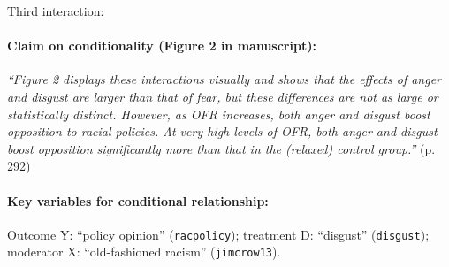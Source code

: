 \documentclass[12pt]{article}
\begin{document}
\noindent Third interaction:

\paragraph{Claim on conditionality (Figure
  2 in manuscript):} \emph{``Figure 2 displays these interactions visually and shows
that the effects of anger and disgust are larger than that
of fear, but these differences are not as large or statistically
distinct. However, as OFR increases, both anger
and disgust boost opposition to racial policies. At very
high levels of OFR, both anger and disgust boost opposition
significantly more than that in the (relaxed) control
group.''} (p. 292)

\paragraph{Key variables for conditional relationship:} Outcome Y:
``policy opinion'' (\texttt{racpolicy}); treatment D: ``disgust'' (\texttt{disgust}); moderator X: ``old-fashioned racism'' (\texttt{jimcrow13}).


\clearpage
\end{document}
